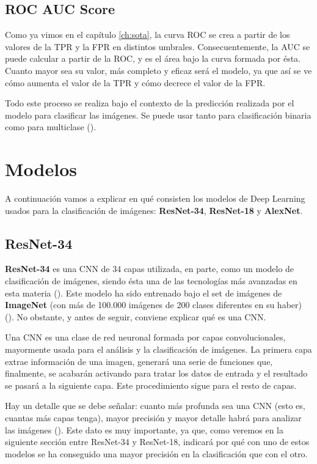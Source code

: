 \subsection{ROC AUC Score}

Como ya vimos en el capítulo \ref{ch:sota}, la curva \ac{ROC} se crea a partir de los valores de la \ac{TPR} y la \ac{FPR} en distintos umbrales. Consecuentemente, la \ac{AUC} se puede calcular a partir de la \ac{ROC}, y es el área bajo la curva formada por ésta. Cuanto mayor sea su valor, más completo y eficaz será el modelo, ya que así se ve cómo aumenta el valor de la \ac{TPR} y cómo decrece el valor de la \ac{FPR}.

Todo este proceso se realiza bajo el contexto de la predicción realizada por el modelo para clasificar las imágenes. Se puede usar tanto para clasificación binaria como para multiclase (\cite{roc-auc-score}). %

\section{Modelos}

A continuación vamos a explicar en qué consisten los modelos de Deep Learning usados para la clasificación de imágenes: \textbf{ResNet-34}, \textbf{ResNet-18} y \textbf{AlexNet}.

\subsection{ResNet-34}

\textbf{ResNet-34} es una \ac{CNN} de 34 capas utilizada, en parte, como un modelo de clasificación de imágenes, siendo ésta una de las tecnologías más avanzadas en esta materia (\cite{resnet34}). Este modelo ha sido entrenado bajo el set de imágenes de \textbf{ImageNet} (con más de 100.000 imágenes de 200 clases diferentes en su haber) (\cite{imagenet}). No obstante, y antes de seguir, conviene explicar qué es una \ac{CNN}. %

Una \ac{CNN} es una clase de red neuronal formada por capas convolucionales, mayormente usada para el análisis y la clasificación de imágenes. La primera capa extrae información de una imagen, generará una serie de funciones que, finalmente, se acabarán activando para tratar los datos de entrada y el resultado se pasará a la siguiente capa. Este procedimiento sigue para el resto de capas.

Hay un detalle que se debe señalar: cuanto más profunda sea una \ac{CNN} (esto es, cuantas más capas tenga), mayor precisión y mayor detalle habrá para analizar las imágenes (\cite{cnn}). Este dato es muy importante, ya que, como veremos en la siguiente sección entre ResNet-34 y ResNet-18, indicará por qué con uno de estos modelos se ha conseguido una mayor precisión en la clasificación que con el otro. %

